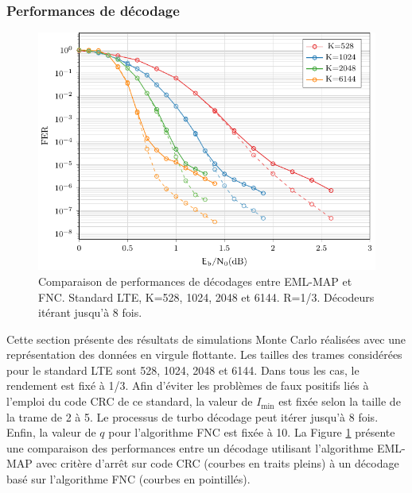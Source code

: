 \subsubsection{Performances de décodage}
\begin{figure}[!t]
	\centering
	\includegraphics[width=\textwidth]{main/ch3_fig/fnc/lte/tikz/lte.pdf}
	\caption{Comparaison de performances de décodages entre EML-MAP et FNC. Standard LTE, K=528, 1024, 2048 et 6144. R=1/3.
	Décodeurs itérant jusqu'à 8 fois. \label{fig:fnc_lte}}
\end{figure}
Cette section présente des résultats de simulations Monte Carlo réalisées avec une représentation des données en 
virgule flottante.
Les tailles des trames considérées pour le standard LTE sont 528, 1024, 2048 et 6144. Dans tous les cas, le rendement
est fixé à 1/3. Afin d'éviter les problèmes de
faux positifs liés à l'emploi du code CRC de ce standard, la valeur de $I_\text{min}$ est fixée selon la 
taille de la trame de 2 à 5. Le processus
de turbo décodage peut itérer jusqu'à 8 fois. Enfin, la valeur de $q$ pour l'algorithme FNC est fixée à 10. La Figure 
\ref{fig:fnc_lte} présente une comparaison des performances entre un décodage utilisant l'algorithme EML-MAP avec critère 
d'arrêt sur code CRC (courbes en traits pleins) à un décodage basé sur l'algorithme FNC (courbes en pointillés).

